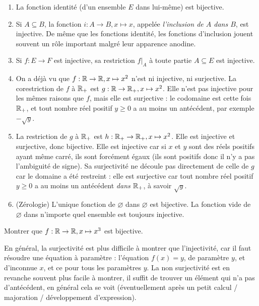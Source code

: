 \begin{exemple}
\begin{enumerate}
\item La fonction identité (d'un ensemble $E$ dans lui-même) est bijective.
\item Si $A\subseteq B$, la fonction $i : A\to B, x\mapsto x$, appelée \emph{l'inclusion de $A$ dans $B$}, est injective. De même que les fonctions identité, les fonctions d'inclusion jouent souvent un rôle important malgré leur apparence anodine.
\item Si $f : E\to F$ est injective, sa restriction $f|_A$ à toute partie $A\subseteq E$ est injective.
\item On a déjà vu que $f : \mathbb{R} \to \mathbb{R}, x\mapsto x^2$ n'est ni injective, ni surjective. La corestriction de $f$ à $\mathbb{R}_+$ est $g : \mathbb{R} \to \mathbb{R}_+, x\mapsto x^2$. Elle n'est pas injective pour les mêmes raisons que $f$, mais elle est surjective : le codomaine est cette fois $\mathbb{R}_+$, et tout nombre réel positif $y\geq 0$ a au moins un antécédent, par exemple $-\sqrt{y}$.
\item La restriction de $g$ à $\mathbb{R}_+$ est $h : \mathbb{R}_+ \to \mathbb{R}_+, x\mapsto x^2$. Elle est injective et surjective, donc bijective. Elle est injective car si $x$ et $y$ sont des réels positifs ayant même carré, ils sont forcément égaux (ils sont positifs donc il n'y a pas l'ambiguité de signe). Sa surjectivité ne découle pas directement de celle de $g$ car le domaine a été restreint : elle est surjective car tout nombre réel positif $y\geq 0$ a au moins un antécédent \emph{dans $\mathbb{R}_+$}, à savoir $\sqrt{y}$.
\item (Zérologie) L'unique fonction de $\varnothing$ dans $\varnothing$ est bijective. La fonction vide de $\varnothing$ dans n'importe quel ensemble est toujours injective.
\end{enumerate}
\end{exemple}

\begin{exercice}
Montrer que  $f: \mathbb{R}\to \mathbb{R}, x\mapsto x^3$ est bijective.
\end{exercice}


\begin{remarque}
En général, la surjectivité est plus difficile à montrer que l'injectivité, car il faut résoudre une équation à paramètre : l'équation $f(x)=y$, de paramètre $y$, et d'inconnue $x$, et ce pour tous les paramètres $y$. La non surjectivité est en revanche souvent plus facile à montrer, il suffit de trouver un élément qui n'a pas d'antécédent, en général cela se voit (éventuellement après un petit calcul / majoration / développement d'expression).
\end{remarque}

